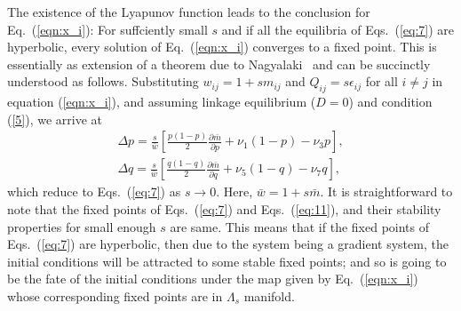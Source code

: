 \documentclass[
 pre,
 aps,
 a4paper,
 english,
 showkeys,
 reprint,
 twocolumn,
 superscriptaddress
]{revtex4}
\begin{document}
The existence of the Lyapunov function leads to the conclusion for Eq.~(\ref{eqn:x_i}): For suffciently small $s$ and if all the equilibria of Eqs.~(\ref{eq:7}) are hyperbolic, every solution of Eq.~(\ref{eqn:x_i}) converges to a fixed point. This is essentially as extension of a theorem due to Nagyalaki~\cite{nagylaki1999JMB} and can be succinctly understood as follows. Substituting $w_{ij}=1+sm_{ij}$ and $Q_{ij}=s\epsilon_{ij}$ for all $i \ne j$ in equation (\ref{eqn:x_i}), and assuming linkage equilibrium ($D=0$) and condition (\ref{5}), we arrive at
\begin{subequations}\label{eq:11}
\begin{eqnarray}
\Delta p=\frac{s}{\bar{w}} \left[ \frac{p(1-p)}{2}\frac{\partial \bar{m}}{\partial p}+\nu_1(1-p)-\nu_3 p\right], \\
\Delta q=\frac{s}{\bar{w}} \left[ \frac{q(1-q)}{2}\frac{\partial \bar{m}}{\partial q}+\nu_5(1-q)-\nu_7 q\right],
\end{eqnarray}
\end{subequations}
which reduce to Eqs.~(\ref{eq:7}) as $s\rightarrow0$. Here, $\bar{w}=1+s\bar{m}$. It is straightforward to note that the fixed points of Eqs.~(\ref{eq:7}) and Eqs.~(\ref{eq:11}), and their stability properties for small enough $s$ are same. This means that if the fixed points of Eqs.~(\ref{eq:7}) are hyperbolic, then due to the system being a gradient system, the initial conditions will be attracted to some stable fixed points; and so is going to be the fate of the initial conditions under the map given by Eq.~(\ref{eqn:x_i}) whose corresponding fixed points are in $\Lambda_s$ manifold.
\end{document}
